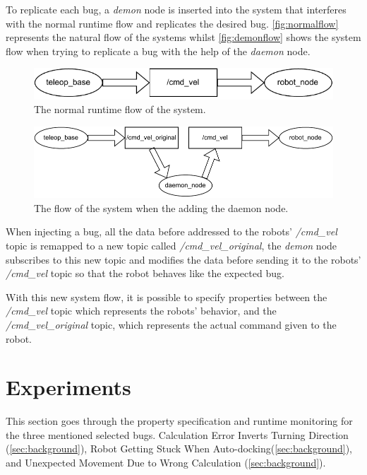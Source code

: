 To replicate each bug, a \textit{demon} node is inserted into the system that interferes with the normal runtime flow and replicates the desired bug. \autoref{fig:normalflow} represents the natural flow of the systems whilst \autoref{fig:demonflow} shows the system flow when trying to replicate a bug with the help of the \textit{daemon} node.

\begin{figure}
\includegraphics[width=\textwidth]{images/normal_flow.pdf}
\caption{The normal runtime flow of the system.} \label{fig:normalflow}
\end{figure}
    
\begin{figure}
\includegraphics[width=\textwidth]{images/demon_flow.pdf}
\caption{The flow of the system when the adding the daemon node.} \label{fig:demonflow}
\end{figure}

When injecting a bug, all the data before addressed to the robots' \textit{/cmd\_vel} topic is remapped to a new topic called \textit{/cmd\_vel\_original}, the \textit{demon} node subscribes to this new topic and modifies the data before sending it to the robots' \textit{/cmd\_vel} topic so that the robot behaves like the expected bug. 

With this new system flow, it is possible to specify properties between the \textit{/cmd\_vel} topic which represents the robots' behavior, and the \textit{/cmd\_vel\_original} topic, which represents the actual command given to the robot.


\section{Experiments}
\label{sec:experiments}

This section goes through the property specification and runtime monitoring for the three mentioned selected bugs. Calculation Error Inverts Turning Direction (\autoref{sec:background}), Robot Getting Stuck When Auto-docking(\autoref{sec:background}), and Unexpected Movement Due to Wrong Calculation (\autoref{sec:background}).


